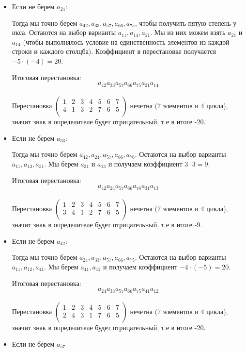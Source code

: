 \documentclass[a4paper,12pt]{article}
\begin{document}
\begin{itemize}
\item Если не берем $a_{24}$:

Тогда мы точно берем $a_{42},  a_{33}, a_{57}, a_{66}, a_{75}$, чтобы получить пятую степень у икса. Остаются на выбор варианты $a_{11}, a_{14}, a_{21}$. Мы из них можем взять $a_{21}$ и $a_{14}$ (чтобы выполнялось условие на единственность элементов из каждой строки и каждого столцба). Коэффициент в перестановке получается $-5 \cdot (-4) = 20 $.

Итоговая перестановка:
\[
a_{42} a_{33}a_{57} a_{66} a_{75}a_{21}a_{14}
\]
\\
Перестановка $\begin{pmatrix}
1 & 2 & 3 & 4 & 5 & 6 & 7\\
4 & 1 & 3 & 2 & 7 & 6 & 5 \\
\end{pmatrix}$ нечетна (7 элементов и 4 цикла), значит знак в определителе будет отрицательный, т.е в итоге -20.
\item Если не берем $a_{33}$:

Тогда мы точно берем $a_{42}, a_{24}, a_{57}, a_{66}, a_{76}$. Остаются на выбор варианты $a_{11}, a_{13}, a_{31}$. Мы берем $a_{31}$ и $a_{13}$ и получаем коэффициент $3 \cdot 3 = 9$. 

Итоговая перестановка:
\[
a_{42} a_{24} a_{57} a_{66} a_{76} a_{31} a_{13}
\]
\\
Перестановка $\begin{pmatrix}
1 & 2 & 3 & 4 & 5 & 6 & 7\\
3 & 4 & 1& 2 & 7 & 6 & 5 \\
\end{pmatrix}$ нечетна (7 элементов и 4 цикла), значит знак в определителе будет отрицательный, т.е в итоге -9.
\item Если не берем $a_{42}$:

Тогда мы точно берем $a_{24}, a_{33}, a_{57}, a_{66}, a_{75}$. Остаются на выбор варианты $a_{11}, a_{12}, a_{41}$. Мы берем $a_{41}, a_{12}$ и получаем коэффициент $-4 \cdot (-5) = 20$. 

Итоговая перестановка:
\[
a_{24}a_{33}a_{57}a_{66} a_{75}a_{41} a_{12}
\]
\\
Перестановка $\begin{pmatrix}
1 & 2 & 3 & 4 & 5 & 6 & 7\\
2 & 4 & 3& 1& 7 & 6 & 5 \\
\end{pmatrix}$  нечетна (7 элементов и 4 цикла), значит знак в определителе будет отрицательный, т.е в итоге -20.
\item Если не берем $a_{57}$


\end{itemize}
\end{document}
